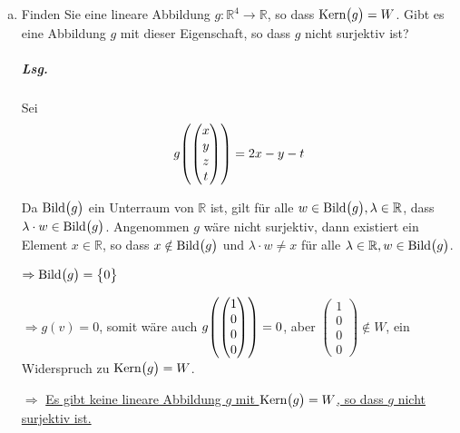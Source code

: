 \documentclass{scrreprt}
\newcommand\Bild{\text{Bild}}
\newcommand\Kern{\text{Kern}}
\begin{document}
\begin{enumerate}[(a)]
\item Finden Sie eine lineare Abbildung $g \colon \mathbb{R}^4 \to \mathbb{R}$,
  so dass $\Kern\qty\big(g) = W$.
  Gibt es eine Abbildung $g$ mit dieser Eigenschaft, so dass $g$ nicht
  surjektiv ist?
  \subparagraph{Lsg.} Sei
  \[
    g\qty(\begin{pmatrix} x \\ y \\ z \\ t \end{pmatrix}) = 2x - y - t
  \]

  Da $\Bild\qty\big(g)$ ein Unterraum von $\mathbb{R}$ ist,
  gilt für alle $w \in \Bild\qty\big(g), \lambda \in \mathbb{R}$, dass
  $\lambda \cdot w \in \Bild\qty\big(g)$.
  Angenommen $g$ wäre nicht surjektiv, dann existiert ein Element
  $x \in \mathbb{R}$, so dass $x \notin \Bild\qty\big(g)$ und
  $\lambda \cdot w \ne x$ für alle
  $\lambda \in \mathbb{R}, w \in \Bild\qty\big(g)$.

  $\Rightarrow \Bild\qty\big(g) = \qty\big{0}$

  $\Rightarrow g(v) = 0$, somit wäre auch
  $g\qty(\begin{pmatrix} 1 \\ 0 \\ 0 \\ 0\end{pmatrix}) = 0$, aber
  $\begin{pmatrix} 1 \\ 0 \\ 0 \\ 0\end{pmatrix} \notin W$, ein Widerspruch zu
  $\Kern\qty\big(g) = W$.

  $\Rightarrow$ \underline{Es gibt keine lineare Abbildung $g$ mit
    $\Kern\qty\big(g) = W$, so dass $g$ nicht surjektiv ist.}
\end{enumerate}
\end{document}

